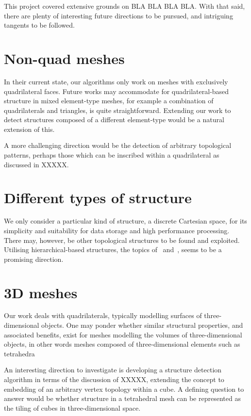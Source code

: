 This project covered extensive grounds on BLA BLA BLA BLA. With that said, there are plenty of interesting future directions to be pursued, and intriguing tangents to be followed.

\section{Non-quad meshes}
In their current state, our algorithms only work on meshes with exclusively quadrilateral faces. Future works may accommodate for quadrilateral-based structure in mixed element-type meshes, for example a combination of quadrilaterals and triangles, is quite straightforward. Extending our work to detect structures composed of a different element-type would be a natural extension of this.

A more challenging direction would be the detection of arbitrary topological patterns, perhaps those which can be inscribed within a quadrilateral as discussed in XXXXX.


\section{Different types of structure}
We only consider a particular kind of structure, a discrete Cartesian space, for its simplicity and suitability for data storage and high performance processing. There may, however, be other topological structures to be found and exploited. Utilising hierarchical-based structures, the topics of~\cite{li2004hierarchical} and~\cite{bergen2004hierarchical}, seems to be a promising direction.


\section{3D meshes}
Our work deals with quadrilaterals, typically modelling surfaces of three-dimensional objects. One may ponder whether similar structural properties, and associated benefits, exist for meshes modelling the volumes of three-dimensional objects, in other words meshes composed of three-dimensional elements such as tetrahedra

An interesting direction to investigate is developing a structure detection algorithm in terms of the discussion of XXXXX, extending the concept to embedding of an arbitrary vertex topology within a cube. A defining question to answer would be whether structure in a tetrahedral mesh can be represented as the tiling of cubes in three-dimensional space.


